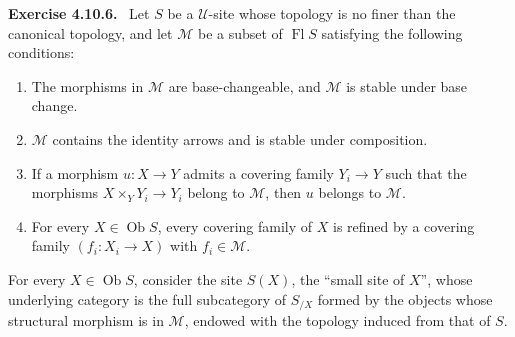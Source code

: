 \documentclass[11pt]{article}
\newcommand{\U}{\mathcal{U}}
\newcommand{\M}{\mathcal{M}}
\newcommand{\Ob}{\operatorname{Ob}}
\newcommand{\Fl}{\operatorname{Fl}}
\newenvironment{remarktext}[1]{\par\medskip\noindent\textbf{#1.}\ }{\par\medskip}
\begin{document}
\begin{remarktext}{Exercise 4.10.6}
Let \(S\) be a \(\U\)-site whose topology is no finer than the canonical topology, and let \(\M\) be a subset of \(\Fl S\) satisfying the following conditions:
\begin{enumerate}[label=\alph*)]
\item The morphisms in \(\M\) are base-changeable, and \(\M\) is stable under base change.
\item \(\M\) contains the identity arrows and is stable under composition.
\item If a morphism \(u:X\to Y\) admits a covering family \(Y_i\to Y\) such that the morphisms \(X\times_YY_i\to Y_i\) belong to \(\M\), then \(u\) belongs to \(\M\).
\item For every \(X\in\Ob S\), every covering family of \(X\) is refined by a covering family \((f_i:X_i\to X)\) with \(f_i\in\M\).
\end{enumerate}
For every \(X\in\Ob S\), consider the site \(S(X)\), the ``small site of \(X\)'', whose underlying category is the full subcategory of \(S_{/X}\) formed by the objects whose structural morphism is in \(\M\), endowed with the topology induced from that of \(S\).


\end{remarktext}
\end{document}
